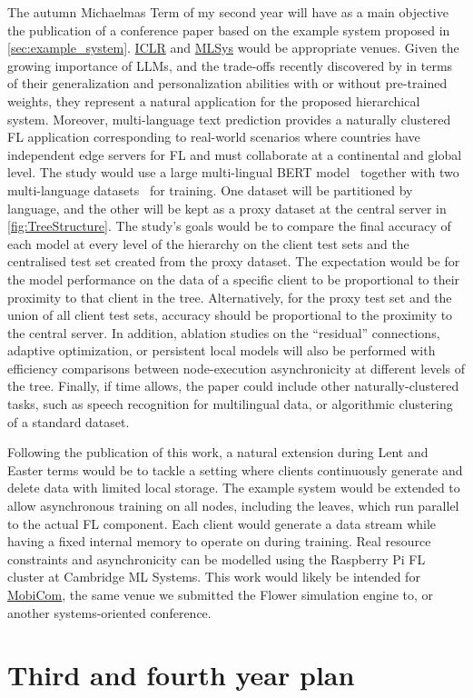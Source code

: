 The autumn Michaelmas Term of my second year will have as a main objective the publication of a conference paper based on the example system proposed in \cref{sec:example_system}. \href{https://iclr.cc/}{ICLR} and \href{https://mlsys.org/}{MLSys} would be appropriate venues. Given the growing importance of LLMs, and the trade-offs recently discovered by \citet{PersonalisationGeneralisationTradeoff} in terms of their generalization and personalization abilities with or without pre-trained weights, they represent a natural application for the proposed hierarchical system. Moreover, multi-language text prediction provides a naturally clustered FL application corresponding to real-world scenarios where countries have independent edge servers for FL and must collaborate at a continental and global level. The study would use a large multi-lingual BERT model~\citep{RoBERTA} together with two multi-language datasets~\citep[e.g., ][]{XGLUE,mC4} for training. One dataset will be partitioned by language, and the other will be kept as a proxy dataset at the central server in \cref{fig:TreeStructure}. The study's goals would be to compare the final accuracy of each model at every level of the hierarchy on the client test sets and the centralised test set created from the proxy dataset. The expectation would be for the model performance on the data of a specific client to be proportional to their proximity to that client in the tree. Alternatively, for the proxy test set and the union of all client test sets, accuracy should be proportional to the proximity to the central server. In addition, ablation studies on the ``residual'' connections, adaptive optimization, or persistent local models will also be performed with efficiency comparisons between node-execution asynchronicity at different levels of the tree.   Finally, if time allows, the paper could include other naturally-clustered tasks, such as speech recognition for multilingual data, or algorithmic clustering of a standard dataset.

Following the publication of this work, a natural extension during Lent and Easter terms would be to tackle a setting where clients continuously generate and delete data with limited local storage. The example system would be extended to allow asynchronous training on all nodes, including the leaves, which run parallel to the actual FL component. Each client would generate a data stream while having a fixed internal memory to operate on during training. Real resource constraints and asynchronicity can be modelled using the Raspberry Pi FL cluster at Cambridge ML Systems. This work would likely be intended for \href{https://sigmobile.org/mobicom/2023/}{MobiCom}, the same venue we submitted the Flower simulation engine to, or another systems-oriented conference.

\section{Third and fourth year plan}

